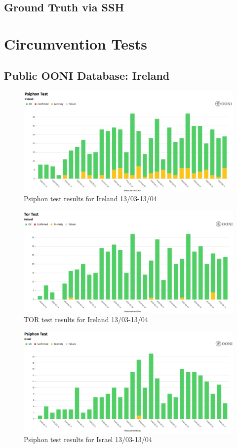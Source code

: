\subsection{Ground Truth via SSH}

\section{Circumvention Tests}
\subsection{Public OONI Database: Ireland}

\begin{figure} [H]
    \centering
    \includegraphics[width=0.5\linewidth]{IREDBPSI.png}
    \caption{Psiphon test results for Ireland 13/03-13/04}
    \label{fig:enter-label}
\end{figure}

\begin{figure} [H]
    \centering
    \includegraphics[width=0.5\linewidth]{IREDBTOR.png}
    \caption{TOR test results for Ireland 13/03-13/04}
    \label{fig:enter-label}
\end{figure}

\begin{figure} [H]
    \centering
    \includegraphics[width=0.5\linewidth]{ISROONIPSI.png}
    \caption{Psiphon test results for Israel 13/03-13/04}
    \label{fig:enter-label}
\end{figure}

